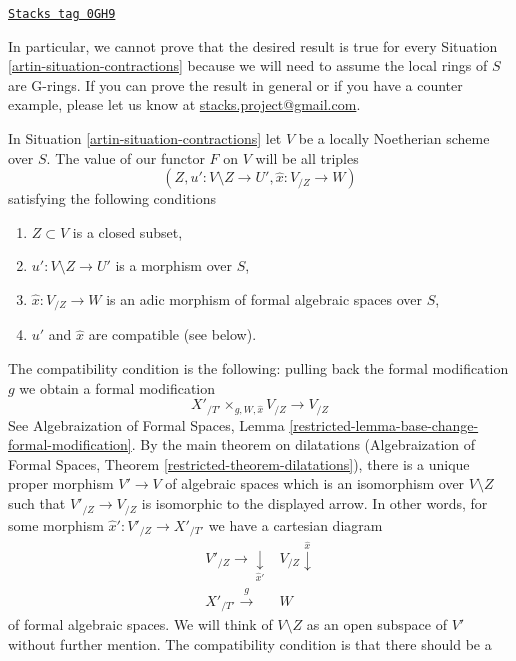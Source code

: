 \begin{remark}[G rings]
\label{artin-remark-G-rings}
\href{https://stacks.math.columbia.edu/tag/0GH9}{\texttt{Stacks tag 0GH9}}

In particular, we cannot prove that the desired result is true for
every Situation \ref{artin-situation-contractions} because we will need to
assume the local rings of $S$ are G-rings. If you can prove the
result in general or if you have a counter example, please let
us know at
\href{mailto:stacks.project@gmail.com}{stacks.project@gmail.com}.
\end{remark}

In Situation \ref{artin-situation-contractions}
let $V$ be a locally Noetherian scheme over $S$.
The value of our functor $F$ on $V$ will be all triples
$$
(Z, u' : V \setminus Z \to U', \hat x : V_{/Z} \to W)
$$
satisfying the following conditions
\begin{enumerate}
\item $Z \subset V$ is a closed subset,
\item $u' : V \setminus Z \to U'$ is a morphism over $S$,
\item $\hat x : V_{/Z} \to W$ is an adic morphism of formal algebraic
spaces over $S$,
\item $u'$ and $\hat x$ are compatible (see below).
\end{enumerate}
The compatibility condition is the following: pulling back the
formal modification $g$ we obtain a formal modification
$$
X'_{/T'} \times_{g, W, \hat x} V_{/Z} \longrightarrow V_{/Z}
$$
See Algebraization of Formal Spaces, Lemma
\ref{restricted-lemma-base-change-formal-modification}.
By the main theorem on dilatations
(Algebraization of Formal Spaces, Theorem
\ref{restricted-theorem-dilatations}), there is a unique proper
morphism $V' \to V$ of algebraic spaces which is an isomorphism over
$V \setminus Z$ such that $V'_{/Z} \to V_{/Z}$ is isomorphic to the
displayed arrow. In other words, for some morphism
$\hat x' : V'_{/Z} \to X'_{/T'}$ we have a cartesian diagram
$$
\begin{array}{cc}V'_{/Z} \longrightarrow\underset{\hat x'}{\downarrow} & V_{/Z} \overset{\hat x}{\downarrow} \\ X'_{/T'} \overset{g}{\longrightarrow} & W\end{array}
$$
of formal algebraic spaces. We will think
of $V \setminus Z$ as an open subspace of $V'$ without further mention.
The compatibility condition is that there should be a
